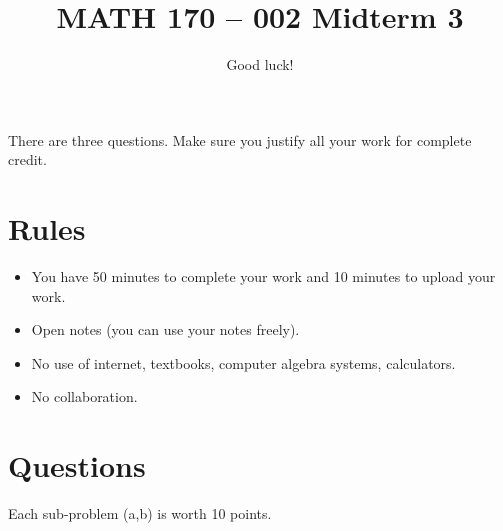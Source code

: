 \documentclass[12pt]{amsart}
\title{ MATH 170 -- 002 Midterm 3 }
\author{Good luck!}
\date{}
\begin{document}
\maketitle

There are three questions. Make sure you justify all your work for complete credit.

\section*{Rules}

\begin{itemize}[leftmargin=*]
    \item You have 50 minutes to complete your work and 10 minutes to upload your work.
    \item Open notes (you can use your notes freely).
    \item No use of internet, textbooks, computer algebra systems, calculators. 
    \item No collaboration.
\end{itemize}

\section*{Questions}
Each sub-problem (a,b) is worth 10 points.
\end{document}
